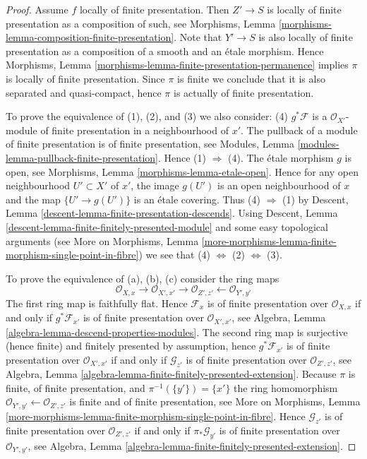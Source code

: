 \documentclass[10pt,a4paper]{amsart}
\theoremstyle{plain}
\theoremstyle{definition}
\theoremstyle{remark}
\numberwithin{equation}{subsection}
\begin{document}
\begin{proof}
Assume $f$ locally of finite presentation. Then $Z' \to S$ is locally
of finite presentation as a composition of such, see
Morphisms, Lemma \ref{morphisms-lemma-composition-finite-presentation}.
Note that $Y' \to S$ is also locally of finite presentation as a composition
of a smooth and an \'etale morphism. Hence
Morphisms, Lemma \ref{morphisms-lemma-finite-presentation-permanence}
implies $\pi$ is locally of finite presentation.
Since $\pi$ is finite we conclude that it is also separated and
quasi-compact, hence $\pi$ is actually of finite presentation.

\medskip\noindent
To prove the equivalence of (1), (2), and (3) we also consider:
(4) $g^*\mathcal{F}$ is a $\mathcal{O}_{X'}$-module of finite presentation
in a neighbourhood of $x'$. The pullback of a module of finite presentation
is of finite presentation, see
Modules, Lemma \ref{modules-lemma-pullback-finite-presentation}.
Hence (1) $\Rightarrow$ (4).
The \'etale morphism $g$ is open, see
Morphisms, Lemma \ref{morphisms-lemma-etale-open}.
Hence for any open neighbourhood $U' \subset X'$ of $x'$, the image
$g(U')$ is an open neighbourhood of $x$ and the map
$\{U' \to g(U')\}$ is an \'etale covering. Thus (4) $\Rightarrow$ (1) by
Descent, Lemma \ref{descent-lemma-finite-presentation-descends}.
Using
Descent, Lemma \ref{descent-lemma-finite-finitely-presented-module}
and some easy topological arguments (see
More on Morphisms,
Lemma \ref{more-morphisms-lemma-finite-morphism-single-point-in-fibre})
we see that
(4) $\Leftrightarrow$ (2) $\Leftrightarrow$ (3).

\medskip\noindent
To prove the equivalence of (a), (b), (c) consider the ring maps
$$
\mathcal{O}_{X, x} \to
\mathcal{O}_{X', x'} \to
\mathcal{O}_{Z', z'} \leftarrow
\mathcal{O}_{Y', y'}
$$
The first ring map is faithfully flat. Hence
$\mathcal{F}_x$ is of finite presentation over $\mathcal{O}_{X, x}$
if and only if $g^*\mathcal{F}_{x'}$ is of finite presentation over
$\mathcal{O}_{X', x'}$, see
Algebra, Lemma \ref{algebra-lemma-descend-properties-modules}.
The second ring map is surjective (hence finite) and
finitely presented by assumption, hence
$g^*\mathcal{F}_{x'}$ is of finite presentation over $\mathcal{O}_{X', x'}$
if and only if $\mathcal{G}_{z'}$ is of finite presentation over
$\mathcal{O}_{Z', z'}$, see
Algebra, Lemma \ref{algebra-lemma-finite-finitely-presented-extension}.
Because $\pi$ is finite, of finite presentation, and
$\pi^{-1}(\{y'\}) = \{x'\}$ the ring homomorphism
$\mathcal{O}_{Y', y'} \leftarrow \mathcal{O}_{Z', z'}$ is finite
and of finite presentation, see
More on Morphisms,
Lemma \ref{more-morphisms-lemma-finite-morphism-single-point-in-fibre}.
Hence $\mathcal{G}_{z'}$ is of finite presentation over $\mathcal{O}_{Z', z'}$
if and only if $\pi_*\mathcal{G}_{y'}$ is of finite presentation over
$\mathcal{O}_{Y', y'}$, see
Algebra, Lemma \ref{algebra-lemma-finite-finitely-presented-extension}.
\end{proof}
\end{document}
